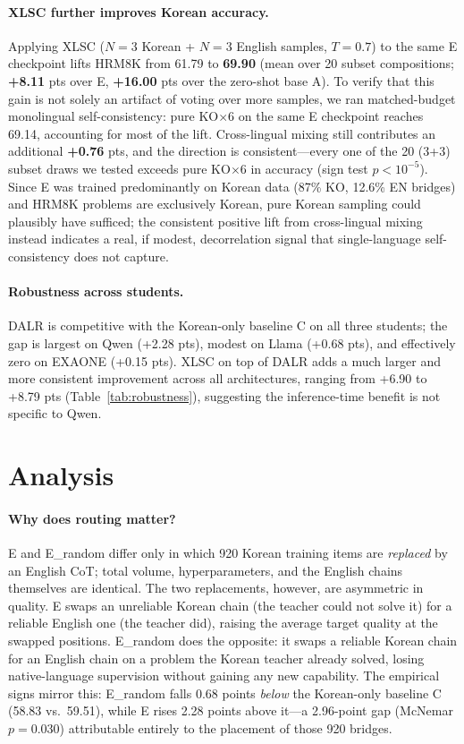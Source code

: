\documentclass{article}
\begin{document}
\paragraph{XLSC further improves Korean accuracy.}
Applying XLSC ($N{=}3$ Korean + $N{=}3$ English samples, $T{=}0.7$)
to the same E checkpoint lifts HRM8K from 61.79 to \textbf{69.90}
(mean over 20 subset compositions; \textbf{+8.11} pts over E,
\textbf{+16.00} pts over the zero-shot base A). To verify
that this gain is not solely an artifact of voting over more samples,
we ran matched-budget monolingual self-consistency: pure KO$\times$6
on the same E checkpoint reaches 69.14, accounting for most of the
lift. Cross-lingual mixing still contributes an additional
\textbf{+0.76} pts, and the direction is consistent---every one of the
20 (3+3) subset draws we tested exceeds pure KO$\times$6 in accuracy
(sign test $p < 10^{-5}$). Since E was trained predominantly on
Korean data (87\% KO, 12.6\% EN bridges) and HRM8K problems are
exclusively Korean, pure Korean sampling could plausibly have
sufficed; the consistent positive lift from cross-lingual mixing
instead indicates a real, if modest, decorrelation signal that
single-language self-consistency does not capture.

\paragraph{Robustness across students.}
DALR is competitive with the Korean-only baseline C on all three
students; the gap is largest on Qwen (+2.28 pts), modest on Llama
(+0.68 pts), and effectively zero on EXAONE (+0.15 pts). XLSC on top
of DALR adds a much larger and more consistent improvement across
all architectures, ranging from +6.90 to +8.79 pts
(Table~\ref{tab:robustness}), suggesting the inference-time benefit
is not specific to Qwen.

\section{Analysis}
\label{sec:analysis}

\paragraph{Why does routing matter?}
E and E\_random differ only in which 920 Korean training items are
\emph{replaced} by an English CoT; total volume, hyperparameters,
and the English chains themselves are identical. The two replacements,
however, are asymmetric in quality. E swaps an unreliable Korean
chain (the teacher could not solve it) for a reliable English one
(the teacher did), raising the average target quality at the swapped
positions. E\_random does the opposite: it swaps a reliable Korean
chain for an English chain on a problem the Korean teacher already
solved, losing native-language supervision without gaining any new
capability. The empirical signs mirror this: E\_random falls 0.68
points \emph{below} the Korean-only baseline C (58.83 vs.\ 59.51),
while E rises 2.28 points above it---a 2.96-point gap (McNemar
$p=0.030$) attributable entirely to the placement of those 920
bridges.
\end{document}
